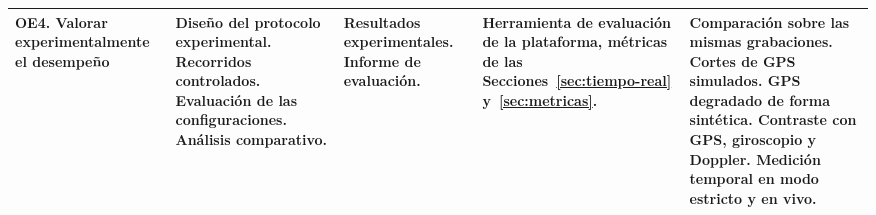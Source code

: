 \begin{table}[H]
\begin{tabularx}{\textwidth}{@{}>{\raggedright\arraybackslash}p{2.1cm}>{\raggedright\arraybackslash}X>{\raggedright\arraybackslash}p{2.6cm}>{\raggedright\arraybackslash}p{2.5cm}>{\raggedright\arraybackslash}X@{}}
\addlinespace
OE4. Valorar experimentalmente el desempeño &
Diseño del protocolo experimental. Recorridos controlados. Evaluación de las configuraciones. Análisis comparativo. &
Resultados experimentales. Informe de evaluación. &
Herramienta de evaluación de la plataforma, métricas de las Secciones~\ref{sec:tiempo-real} y~\ref{sec:metricas}. &
Comparación sobre las mismas grabaciones. Cortes de GPS simulados. GPS degradado de forma sintética. Contraste con GPS, giroscopio y Doppler. Medición temporal en modo estricto y en vivo. \\
\bottomrule
\end{tabularx}
\end{table}

